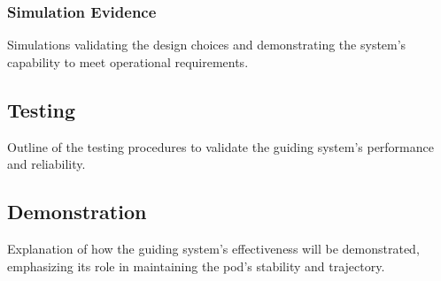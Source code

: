 \subsubsection{Simulation Evidence}
Simulations validating the design choices and demonstrating the system's capability to meet operational requirements.

\subsection{Testing}
Outline of the testing procedures to validate the guiding system's performance and reliability.

\subsection{Demonstration}
Explanation of how the guiding system's effectiveness will be demonstrated, emphasizing its role in maintaining the pod's stability and trajectory.
